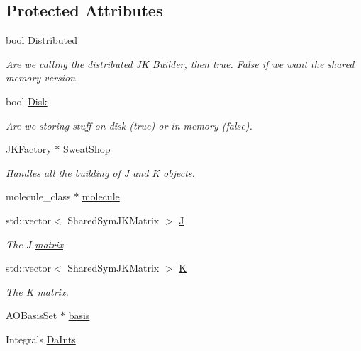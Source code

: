 \subsection*{Protected Attributes}
\begin{DoxyCompactItemize}
\item 
bool \hyperlink{classJKBuilder_1_1JK_a072479da68be17a25570325316eade23}{Distributed}
\begin{DoxyCompactList}\small\item\em Are we calling the distributed \hyperlink{classJKBuilder_1_1JK}{JK} Builder, then true. False if we want the shared memory version. \item\end{DoxyCompactList}\item 
bool \hyperlink{classJKBuilder_1_1JK_a6324fcb7d27b80663a26f90a35f2e9b9}{Disk}
\begin{DoxyCompactList}\small\item\em Are we storing stuff on disk (true) or in memory (false). \item\end{DoxyCompactList}\item 
JKFactory $\ast$ \hyperlink{classJKBuilder_1_1JK_a09e4ffeb9ba2c95bf981da66beecc033}{SweatShop}
\begin{DoxyCompactList}\small\item\em Handles all the building of J and K objects. \item\end{DoxyCompactList}\item 
molecule\_\-class $\ast$ \hyperlink{classJKBuilder_1_1JK_ad646bdee4fc9f601f954b4a98c4da476}{molecule}
\item 
std::vector$<$ SharedSymJKMatrix $>$ \hyperlink{classJKBuilder_1_1JK_aa04a91cc219b5dabfce19d5316f96887}{J}
\begin{DoxyCompactList}\small\item\em The J \hyperlink{classJKBuilder_1_1matrix}{matrix}. \item\end{DoxyCompactList}\item 
std::vector$<$ SharedSymJKMatrix $>$ \hyperlink{classJKBuilder_1_1JK_a5160b673d25f0110d98097f8e7364315}{K}
\begin{DoxyCompactList}\small\item\em The K \hyperlink{classJKBuilder_1_1matrix}{matrix}. \item\end{DoxyCompactList}\item 
AOBasisSet $\ast$ \hyperlink{classJKBuilder_1_1JK_a81392b84b45d3cf84c5c105e9fd5d09c}{basis}
\item 
Integrals \hyperlink{classJKBuilder_1_1JK_ad95ede2076c192d856848b3635efc38e}{DaInts}
\end{DoxyCompactItemize}
